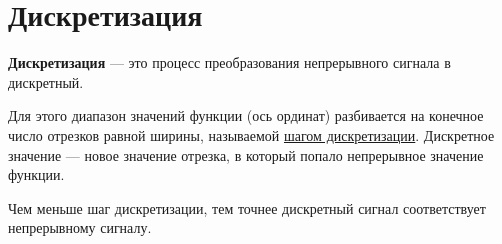 \documentclass[a4paper, 12pt]{article}
\begin{document}
\section*{Дискретизация}

\textbf{Дискретизация} --- это процесс преобразования непрерывного сигнала
в дискретный.

Для этого диапазон значений функции (ось ординат) разбивается на конечное
число отрезков равной ширины, называемой \underline{шагом дискретизации}.
Дискретное значение --- новое значение отрезка, в который попало непрерывное
значение функции. %

Чем меньше шаг дискретизации, тем точнее дискретный сигнал соответствует
непрерывному сигналу. %
\end{document}
